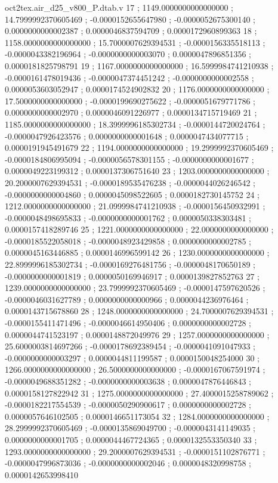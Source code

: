 \begin{filecontents}[overwrite]{oct2tex.air_d25_v800_P.dtab.v}
17 ; 1149.0000000000000000 ; 14.7999992370605469 ; -0.0000152655647980 ; -0.0000052675300140 ; 0.0000000000002387 ; 0.0000046837594709 ; 0.0000172960899363
18 ; 1158.0000000000000000 ; 15.7000007629394531 ; -0.0000156335518113 ; -0.0000043382196964 ; -0.0000000000003070 ; 0.0000047896851356 ; 0.0000181825798791
19 ; 1167.0000000000000000 ; 16.5999984741210938 ; -0.0000161478019436 ; -0.0000047374451242 ; -0.0000000000002558 ; 0.0000053603052947 ; 0.0000174524902832
20 ; 1176.0000000000000000 ; 17.5000000000000000 ; -0.0000199690275622 ; -0.0000051679771786 ; 0.0000000000002970 ; 0.0000046091226977 ; 0.0000134715719469
21 ; 1185.0000000000000000 ; 18.3999996185302734 ; -0.0000144720024764 ; -0.0000047926423576 ; 0.0000000000001648 ; 0.0000047434077715 ; 0.0000191945491679
22 ; 1194.0000000000000000 ; 19.2999992370605469 ; -0.0000184806995094 ; -0.0000056578301155 ; -0.0000000000001677 ; 0.0000049223199312 ; 0.0000137306751640
23 ; 1203.0000000000000000 ; 20.2000007629394531 ; -0.0000189535476238 ; -0.0000044026246542 ; -0.0000000000004860 ; 0.0000045098522605 ; 0.0000182730145752
24 ; 1212.0000000000000000 ; 21.0999984741210938 ; -0.0000156450932991 ; -0.0000048498695833 ; -0.0000000000001762 ; 0.0000050338303481 ; 0.0000157418289746
25 ; 1221.0000000000000000 ; 22.0000000000000000 ; -0.0000185522058018 ; -0.0000048923429858 ; 0.0000000000002785 ; 0.0000045163446885 ; 0.0000146996599142
26 ; 1230.0000000000000000 ; 22.8999996185302734 ; -0.0000169276481756 ; -0.0000048170650189 ; -0.0000000000001819 ; 0.0000050169946917 ; 0.0000139827852763
27 ; 1239.0000000000000000 ; 23.7999992370605469 ; -0.0000147597620526 ; -0.0000046031627789 ; 0.0000000000000966 ; 0.0000044236976464 ; 0.0000143715678860
28 ; 1248.0000000000000000 ; 24.7000007629394531 ; -0.0000155411471496 ; -0.0000046614950406 ; 0.0000000000002728 ; 0.0000044741523197 ; 0.0000148872049976
29 ; 1257.0000000000000000 ; 25.6000003814697266 ; -0.0000178692389454 ; -0.0000041091047933 ; -0.0000000000003297 ; 0.0000044811199587 ; 0.0000150048254000
30 ; 1266.0000000000000000 ; 26.5000000000000000 ; -0.0000167067591974 ; -0.0000049688351282 ; -0.0000000000003638 ; 0.0000047876446843 ; 0.0000158127822942
31 ; 1275.0000000000000000 ; 27.4000015258789062 ; -0.0000182217554539 ; -0.0000050290900617 ; 0.0000000000002728 ; 0.0000057646102505 ; 0.0000146651173054
32 ; 1284.0000000000000000 ; 28.2999992370605469 ; -0.0000135869049700 ; -0.0000043141149035 ; 0.0000000000001705 ; 0.0000044467724365 ; 0.0000132553350340
33 ; 1293.0000000000000000 ; 29.2000007629394531 ; -0.0000151102876771 ; -0.0000047996873036 ; -0.0000000000002046 ; 0.0000048320998758 ; 0.0000142653998410

\end{filecontents}
